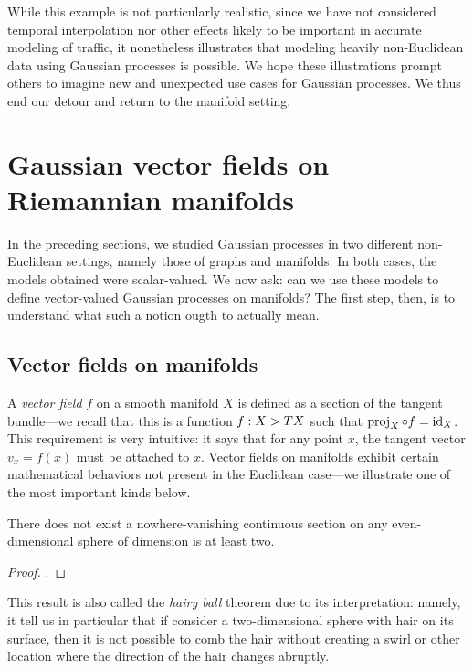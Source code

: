 \documentclass[11pt]{book}
\begin{document}
While this example is not particularly realistic, since we have not considered temporal interpolation nor other effects likely to be important in accurate modeling of traffic, it nonetheless illustrates that modeling heavily non-Euclidean data using Gaussian processes is possible.
We hope these illustrations prompt others to imagine new and unexpected use cases for Gaussian processes.
We thus end our detour and return to the manifold setting.

\section{Gaussian vector fields on Riemannian manifolds}

In the preceding sections, we studied Gaussian processes in two different non-Euclidean settings, namely those of graphs and manifolds.
In both cases, the models obtained were scalar-valued.
We now ask: can we use these models to define vector-valued Gaussian processes on manifolds?
The first step, then, is to understand what such a notion ougth to actually mean.

\subsection{Vector fields on manifolds}

A \emph{vector field} $f$ on a smooth manifold $X$ is defined as a section of the tangent bundle---we recall that this is a function $f : X \-> TX$ such that $\operatorname{proj}_X \circ f = \operatorname{id}_X$.
This requirement is very intuitive: it says that for any point $x$, the tangent vector $v_x = f(x)$ must be attached to $x$.
Vector fields on manifolds exhibit certain mathematical behaviors not present in the Euclidean case---we illustrate one of the most important kinds below.

\begin{result}
There does not exist a nowhere-vanishing continuous section on any even-dimensional sphere of dimension is at least two.
\end{result}

\begin{proof}
\textcite[Theorem 13.32]{lee10}.
\end{proof}

This result is also called the \emph{hairy ball} theorem due to its interpretation: namely, it tell us in particular that if consider a two-dimensional sphere with hair on its surface, then it is not possible to comb the hair without creating a swirl or other location where the direction of the hair changes abruptly.
\end{document}
